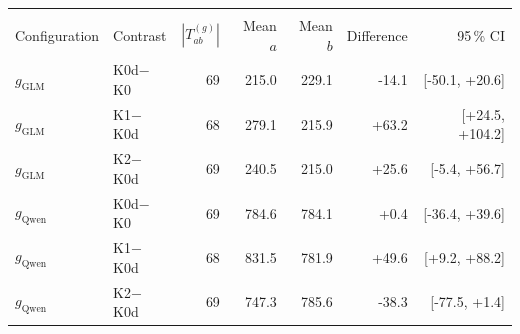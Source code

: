 \begin{tabular}{@{}llrrrrr@{}}
  \addlinespace[8pt]
  \multicolumn{7}{@{}l}{\textbf{Run-time [s]}} \\
  \addlinespace[2pt]
  Configuration & Contrast & $|T^{(g)}_{ab}|$ & Mean $a$ & Mean $b$ & Difference & 95\,\% CI \\
  \midrule
  $g_{\mathrm{GLM}}$ & K0d$-$K0 & 69 & 215.0 & 229.1 & -14.1 & [-50.1, +20.6] \\
  \rowcolor{black!6} $g_{\mathrm{GLM}}$ & K1$-$K0d & 68 & 279.1 & 215.9 & +63.2 & [+24.5, +104.2] \\
  $g_{\mathrm{GLM}}$ & K2$-$K0d & 69 & 240.5 & 215.0 & +25.6 & [-5.4, +56.7] \\
  \addlinespace[4pt]
  \rowcolor{black!6} $g_{\mathrm{Qwen}}$ & K0d$-$K0 & 69 & 784.6 & 784.1 & +0.4 & [-36.4, +39.6] \\
  $g_{\mathrm{Qwen}}$ & K1$-$K0d & 68 & 831.5 & 781.9 & +49.6 & [+9.2, +88.2] \\
  \rowcolor{black!6} $g_{\mathrm{Qwen}}$ & K2$-$K0d & 69 & 747.3 & 785.6 & -38.3 & [-77.5, +1.4] \\
  \bottomrule
\end{tabular}
